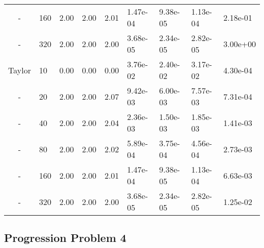 \begin{table}[htbp]
{\begin{tabular}{cllllllll}
   - & 160 & 2.00 & 2.00 & 2.01 & 1.47e-04 & 9.38e-05 & 1.13e-04 & 2.18e-01 \\ 
   - & 320 & 2.00 & 2.00 & 2.00 & 3.68e-05 & 2.34e-05 & 2.82e-05 & 3.00e+00 \\ 
   \hline
   Taylor  &  10 & 0.00 & 0.00 & 0.00 & 3.76e-02 & 2.40e-02 & 3.17e-02 & 4.30e-04 \\ 
   -  &  20 & 2.00 & 2.00 & 2.07 & 9.42e-03 & 6.00e-03 & 7.57e-03 & 7.31e-04 \\ 
   -  &  40 & 2.00 & 2.00 & 2.04 & 2.36e-03 & 1.50e-03 & 1.85e-03 & 1.41e-03 \\ 
   -  &  80 & 2.00 & 2.00 & 2.02 & 5.89e-04 & 3.75e-04 & 4.56e-04 & 2.73e-03 \\ 
   -  & 160 & 2.00 & 2.00 & 2.01 & 1.47e-04 & 9.38e-05 & 1.13e-04 & 6.63e-03 \\ 
   -  & 320 & 2.00 & 2.00 & 2.00 & 3.68e-05 & 2.34e-05 & 2.82e-05 & 1.25e-02 \\ 
   \hline
   \end{tabular}
   }
\end{table}


\subsection{Progression Problem 4}
\begin{table}[htbp]
   \caption{\label{tab:problem4_results_taylor} Convergence Rate for Problem 4 with Absolute Error Using the CRAM Solver}
   \centering
\end{table}

\begin{table}[htbp]
   \caption{\label{tab:problem4_results_taylor} Convergence Rate for Problem 4 with Absolute Error Using the Hyperbolic Solver}
   \centering
\end{table}

